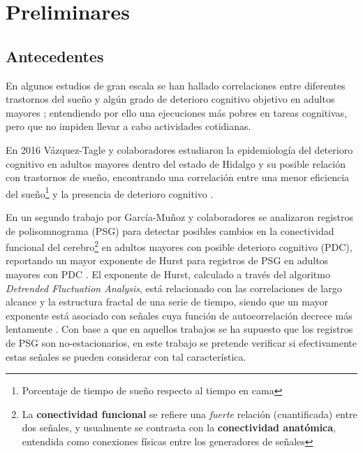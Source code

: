 
\chapter{Preliminares}

\section{Antecedentes}

En algunos estudios de gran escala se han hallado correlaciones entre diferentes trastornos del 
sueño y algún grado de deterioro cognitivo objetivo en adultos mayores 
\cite{Amer13,Miyata13,Reid06,Potvin12}; entendiendo por ello una ejecuciones más pobres en tareas
cognitivas, pero que no impiden llevar a cabo actividades cotidianas.

En 2016 Vázquez-Tagle y colaboradores estudiaron la epidemiología del deterioro cognitivo en 
adultos mayores dentro del estado de Hidalgo y su posible relación con trastornos de sueño, 
encontrando una correlación entre una menor eficiencia del sueño\footnote{Porcentaje de tiempo
de sueño respecto al tiempo en cama} y la presencia de deterioro cognitivo \cite{VazquezTagle16}.

En un segundo trabajo por García-Muñoz y colaboradores \cite{Valeria} se analizaron 
registros de polisomnograma (PSG) 
para detectar posibles cambios en la conectividad funcional del cerebro\footnote{La 
\textbf{conectividad funcional} se refiere una \textit{fuerte} relación (cuantificada) entre dos 
señales, y usualmente se contrasta con la \textbf{conectividad anatómica}, entendida como conexiones 
físicas entre los generadores de señales} en adultos mayores con posible deterioro 
cognitivo (PDC), reportando un mayor exponente de Hurst para registros de PSG en adultos mayores 
con PDC \cite{Valeria}.
El exponente de Hurst, calculado a través del algoritmo \textit{Detrended Fluctuation Analysis}, 
está relacionado con las correlaciones de largo alcance y la estructura fractal de una serie de 
tiempo, siendo que un mayor exponente está asociado con señales cuya función de 
autocorrelación decrece más lentamente \cite{Rodriguez11}.
Con base a que en aquellos trabajos se ha supuesto que los registros de PSG son no-estacionarios, 
en este trabajo se pretende verificar si efectivamente estas señales se pueden considerar con tal
característica.

